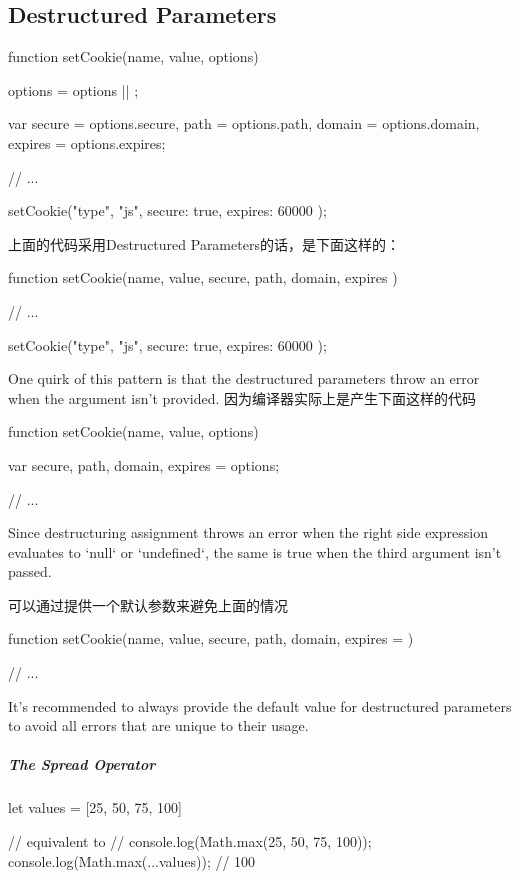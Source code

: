 \subsection{Destructured Parameters}
\begin{JavaScript}
function setCookie(name, value, options) {

    options = options || {};

    var secure = options.secure,
        path = options.path,
        domain = options.domain,
        expires = options.expires;

    // ...
}

setCookie("type", "js", {
    secure: true,
    expires: 60000
});
\end{JavaScript}
上面的代码采用Destructured Parameters的话，是下面这样的：
\begin{JavaScript}
function setCookie(name, value, { secure, path, domain, expires }) {

    // ...
}

setCookie("type", "js", {
    secure: true,
    expires: 60000
});
\end{JavaScript}

One quirk of this pattern is that the destructured parameters throw an error when the argument isn't provided.
因为编译器实际上是产生下面这样的代码
\begin{JavaScript}
function setCookie(name, value, options) {

    var { secure, path, domain, expires } = options;

    // ...
}
\end{JavaScript} 

Since destructuring assignment throws an error when the right side expression evaluates to `null` or `undefined`, the same is true when the third argument isn't passed.

可以通过提供一个默认参数来避免上面的情况
\begin{JavaScript}
function setCookie(name, value, { secure, path, domain, expires } = {}) {

    // ...
}
\end{JavaScript}

It's recommended to always provide the default value for destructured parameters to avoid all errors that are unique to their usage.


\subparagraph{The Spread Operator}

\begin{JavaScript}
let values = [25, 50, 75, 100]

// equivalent to
// console.log(Math.max(25, 50, 75, 100));
console.log(Math.max(...values));           // 100
\end{JavaScript}

